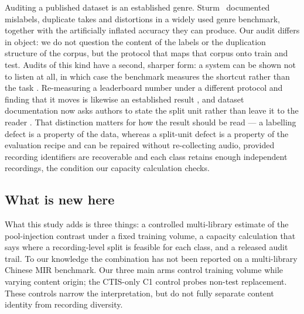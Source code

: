 Auditing a published dataset is an established genre. Sturm~\cite{sturm2012gtzan} documented
mislabels, duplicate takes and distortions in a widely used genre benchmark, together with the
artificially inflated accuracy they can produce. Our audit differs in object: we do not question the content of the labels or the
duplication structure of the corpus, but the protocol that maps that corpus onto train and test.
Audits of this kind have a second, sharper form: a system can be shown not to listen at all, in which case the benchmark measures the shortcut rather than the task \citep{sturm2014horse}. Re-measuring a leaderboard number under a different protocol and finding that it moves is likewise an established result \citep{recht2019}, and dataset documentation now asks authors to state the split unit rather than leave it to the reader \citep{gebru2018}. That distinction matters for how the result should be read --- a labelling defect is a property
of the data, whereas a split-unit defect is a property of the evaluation recipe and can be
repaired without re-collecting audio, provided recording identifiers are recoverable and
each class retains enough independent recordings, the condition our capacity calculation checks.

\subsection{What is new here}

What this study adds is three things: a controlled multi-library estimate of the pool-injection
contrast under a fixed training volume, a capacity calculation that says where a recording-level
split is feasible for each class, and a released audit trail. To our knowledge the combination has
not been reported on a multi-library Chinese MIR benchmark.
Our three main arms control training volume while varying content origin; the CTIS-only C1
control probes non-test replacement. These controls narrow the interpretation, but do not fully
separate content identity from recording diversity.
